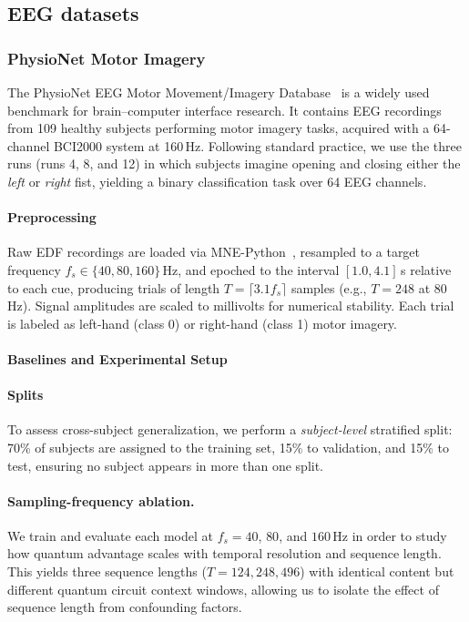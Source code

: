\documentclass[conference]{IEEEtran}
\begin{document}
\subsection{EEG datasets}
\label{sec:eeg_datasets}

\subsubsection{PhysioNet Motor Imagery}
\label{sec:physionet}

The PhysioNet EEG Motor Movement/Imagery Database~\cite{schalk2004bci2000,goldberger2000physiobank} is a widely used benchmark for brain--computer interface research. It contains EEG recordings from 109 healthy subjects performing motor imagery tasks, acquired with a 64-channel BCI2000 system at 160\,Hz.
Following standard practice, we use the three runs (runs 4, 8, and 12) in which subjects imagine opening and closing either the \emph{left} or \emph{right} fist, yielding a binary classification task over 64 EEG channels.

\paragraph{Preprocessing}
Raw EDF recordings are loaded via MNE-Python~\cite{gramfort2013meg}, resampled to a target frequency $f_s \in \{40, 80, 160\}$\,Hz, and epoched to the interval $[1.0, 4.1]$\,s relative to each cue, producing trials of length $T = \lceil 3.1 f_s \rceil$ samples (e.g., $T = 248$ at 80\,Hz).
Signal amplitudes are scaled to millivolts for numerical stability.
Each trial is labeled as left-hand (class 0) or right-hand (class 1) motor imagery.

\paragraph{Baselines and Experimental Setup}

\paragraph{Splits}
To assess cross-subject generalization, we perform a \emph{subject-level} stratified split: 70\% of subjects are assigned to the training set, 15\% to validation, and 15\% to test, ensuring no subject appears in more than one split.

\paragraph{Sampling-frequency ablation.}
We train and evaluate each model at $f_s = 40$, $80$, and $160$\,Hz in order to study how quantum advantage scales with temporal resolution and sequence length.
This yields three sequence lengths ($T = 124, 248, 496$) with identical content but different quantum circuit context windows, allowing us to isolate the effect of sequence length from confounding factors.
\end{document}
